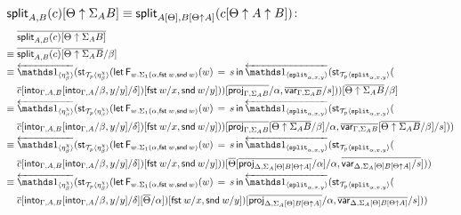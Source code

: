 \documentclass[10pt]{article}
\theoremstyle{definition}
\newcommand\dsd[1]{\ensuremath{\mathsf{#1}}}
\newcommand{\app}[2]{\ensuremath{#1 \: #2}}
\newcommand{\fst}[1]{\app{\dsd{fst}}{#1}}
\newcommand{\snd}[1]{\app{\dsd{snd}}{#1}}
\newcommand{\rewrite}[2]{\overleftarrow{#1}(#2)}
\newcommand\StI[2]{\ensuremath{\mathsf{st}_{#1}(#2)}}
\newcommand\FEs[4]{\ensuremath{\mathsf{let} \, \mathsf{F}_{#1}(#3) \, = \, {#2} \, \mathsf{in} \, #4}}
\newcommand\ApEl[2]{\mathcal{T}_{#1}\langle#2\rangle}
\begin{document}
\begin{enumerate}[style = multiline, labelwidth = 80pt]
\item[{$\mathsf{split}_{A,B}(c)[\Theta \uparrow \Sigma_A B] \equiv \mathsf{split}_{A[\Theta],B[\Theta \uparrow A]}(c[\Theta \uparrow A \uparrow B])$}:]
\begin{align*}
&\upstairs{\qsplit{A,B}(c)[\Theta \uparrow \Sigma_A B]} \\
\equiv{} &\upstairs{\qsplit{A,B}(c)}[\upstairs{\Theta \uparrow \Sigma_A B}/\beta] \\
\equiv{} &\rewrite{\One_{\langle \eta^\chi_\beta \rangle}}{\StI{\ApEl{p}{\eta^\chi_\beta}}{\FEs{w. \Sigma_1(\alpha,\fst w, \snd w)}{s}{w}{\rewrite{\ApOne{\tsplit{\alpha,x,y}}}{\StI{\ApEl{p}{\tsplit{\alpha,x,y}}}{\\&\upstairs{c}[\into{\Gamma, A, B}[\into{\Gamma, A}/\beta, y/y] /\delta]}[\fst w/x, \snd w/y]}})[\upstairs{\proj{\Gamma, \Sigma_A B}}/\alpha, \upstairs{\qvar{\Gamma, \Sigma_A B}}/s]}}[\upstairs{\Theta \uparrow \Sigma_A B}/\beta] \\
\equiv{} &\rewrite{\One_{\langle \eta^\chi_\beta \rangle}}{\StI{\ApEl{p}{\eta^\chi_\beta}}{\FEs{w. \Sigma_1(\alpha,\fst w, \snd w)}{s}{w}{\rewrite{\ApOne{\tsplit{\alpha,x,y}}}{\StI{\ApEl{p}{\tsplit{\alpha,x,y}}}{\\&\upstairs{c}[\into{\Gamma, A, B}[\into{\Gamma, A}/\beta, y/y] /\delta]}[\fst w/x, \snd w/y]}})[\upstairs{\proj{\Gamma, \Sigma_A B}}[\upstairs{\Theta \uparrow \Sigma_A B}/\beta]/\alpha, \upstairs{\qvar{\Gamma, \Sigma_A B}}[\upstairs{\Theta \uparrow \Sigma_A B}/\beta]/s]}} \\
\equiv{} &\rewrite{\One_{\langle \eta^\chi_\beta \rangle}}{\StI{\ApEl{p}{\eta^\chi_\beta}}{\FEs{w. \Sigma_1(\alpha,\fst w, \snd w)}{s}{w}{\rewrite{\ApOne{\tsplit{\alpha,x,y}}}{\StI{\ApEl{p}{\tsplit{\alpha,x,y}}}{\\&\upstairs{c}[\into{\Gamma, A, B}[\into{\Gamma, A}/\beta, y/y] /\delta]}[\fst w/x, \snd w/y]}})[\upstairs{\Theta}[\upstairs{\proj{\Delta, \Sigma_A[\Theta] B[\Theta \uparrow A]}}/\alpha]/\alpha, \upstairs{\qvar{\Delta, \Sigma_A[\Theta] B[\Theta \uparrow A]}/s}]}} \\
\equiv{} &\rewrite{\One_{\langle \eta^\chi_\beta \rangle}}{\StI{\ApEl{p}{\eta^\chi_\beta}}{\FEs{w. \Sigma_1(\alpha,\fst w, \snd w)}{s}{w}{\rewrite{\ApOne{\tsplit{\alpha,x,y}}}{\StI{\ApEl{p}{\tsplit{\alpha,x,y}}}{\\&\upstairs{c}[\into{\Gamma, A, B}[\into{\Gamma, A}/\beta, y/y] /\delta][\upstairs{\Theta}/\alpha]}[\fst w/x, \snd w/y]}}[\upstairs{\proj{\Delta, \Sigma_A[\Theta] B[\Theta \uparrow A]}}/\alpha, \upstairs{\qvar{\Delta, \Sigma_A[\Theta] B[\Theta \uparrow A]}}/s]}} \\

\end{align*}
\end{enumerate}
\end{document}
